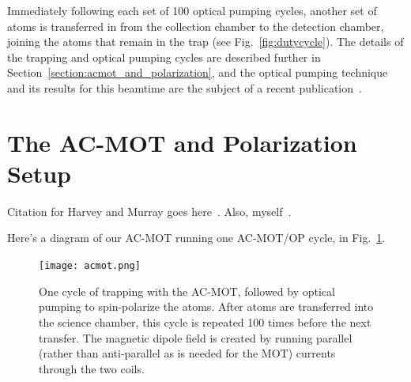 Immediately following each set of 100 optical pumping cycles, another set of atoms is transferred in from the collection chamber to the detection chamber, joining the atoms that remain in the trap (see Fig.~\ref{fig:dutycycle}).  The details of the trapping and optical pumping cycles are described further in Section~\ref{section:acmot_and_polarization}, and the optical pumping technique and its results for this beamtime are the subject of a recent publication~\cite{ben_OP}.



\section{The AC-MOT and Polarization Setup}
\label{sec:acmot}
\label{section:acmot_and_polarization}


Citation for Harvey and Murray goes here~\cite{harveymurray}.  Also, myself~\cite{thesis}.

Here's a diagram of our AC-MOT running one AC-MOT/OP cycle, in Fig.~\ref{fig:acmot}.

\begin{figure}[ht]
	\centering
		\texttt{[image: acmot.png]}
		\caption{One cycle of trapping with the AC-MOT, followed by optical pumping to spin-polarize the atoms.  After atoms are transferred into the science chamber, this cycle is repeated 100 times before the next transfer.  The magnetic dipole field is created by running parallel (rather than anti-parallel as is needed for the MOT) currents through the two coils.}
		\label{fig:acmot}
\end{figure}


